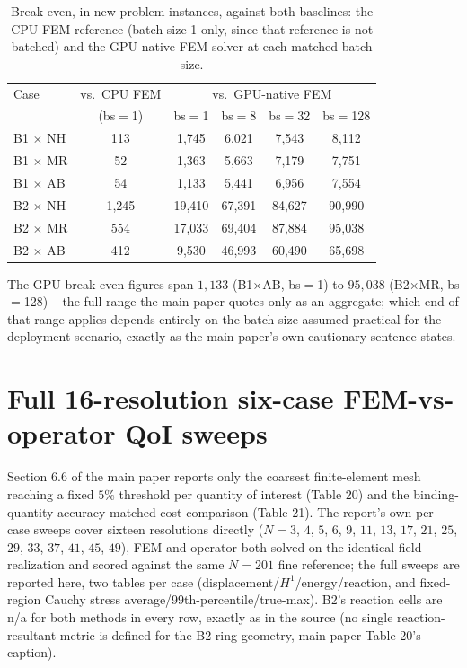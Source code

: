 \documentclass[11pt]{article}
\begin{document}
\begin{table}[h]
\centering
\caption{Break-even, in new problem instances, against both baselines:
  the CPU-FEM reference (batch size 1 only, since that reference is not
  batched) and the GPU-native FEM solver at each matched batch size.}
\label{tab:s1-breakeven}
\small
\begin{tabular}{lccccc}
\toprule
Case & vs.\ CPU FEM & \multicolumn{4}{c}{vs.\ GPU-native FEM} \\
 & (bs$=$1) & bs$=$1 & bs$=$8 & bs$=$32 & bs$=$128 \\
\midrule
B1 $\times$ NH & 113   & 1{,}745  & 6{,}021  & 7{,}543  & 8{,}112 \\
B1 $\times$ MR & 52    & 1{,}363  & 5{,}663  & 7{,}179  & 7{,}751 \\
B1 $\times$ AB & 54    & 1{,}133  & 5{,}441  & 6{,}956  & 7{,}554 \\
B2 $\times$ NH & 1{,}245 & 19{,}410 & 67{,}391 & 84{,}627 & 90{,}990 \\
B2 $\times$ MR & 554   & 17{,}033 & 69{,}404 & 87{,}884 & 95{,}038 \\
B2 $\times$ AB & 412   & 9{,}530  & 46{,}993 & 60{,}490 & 65{,}698 \\
\bottomrule
\end{tabular}
\end{table}

The GPU-break-even figures span $1{,}133$ (B1$\times$AB, bs$=$1) to
$95{,}038$ (B2$\times$MR, bs$=$128) -- the full range the main paper
quotes only as an aggregate; which end of that range applies depends
entirely on the batch size assumed practical for the deployment
scenario, exactly as the main paper's own cautionary sentence states.

\FloatBarrier
\section{Full 16-resolution six-case FEM-vs-operator QoI sweeps}
\label{sec:s2}
Section 6.6 of the main paper reports only the coarsest finite-element
mesh reaching a fixed $5\%$ threshold per quantity of interest (Table 20)
and the binding-quantity accuracy-matched cost comparison (Table 21).
The report's own per-case sweeps cover sixteen resolutions directly
($N{=}3$, $4$, $5$, $6$, $9$, $11$, $13$, $17$, $21$, $25$, $29$, $33$,
$37$, $41$, $45$, $49$), FEM and operator both
solved on the identical field realization and scored against the same
$N{=}201$ fine reference; the full sweeps are reported here, two tables
per case (displacement/$H^1$/energy/reaction, and fixed-region Cauchy
stress average/99th-percentile/true-max). B2's reaction cells are n/a
for both methods in every row, exactly as in the source (no single
reaction-resultant metric is defined for the B2 ring geometry, main
paper Table 20's caption).
\end{document}
